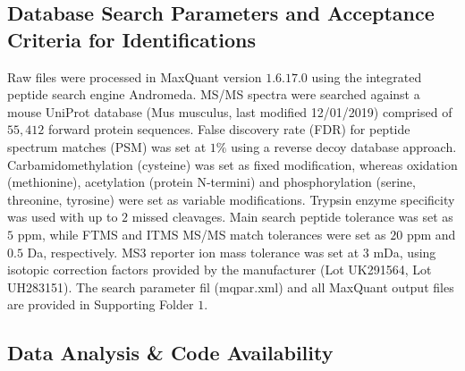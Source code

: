\documentclass[journal=jprobs,manuscript=article]{achemso}
\begin{document}
\subsection{Database Search Parameters and Acceptance Criteria for Identifications}

Raw files were processed in MaxQuant\cite{cox2008maxquant} version $1.6.17.0$ using the integrated peptide search engine Andromeda\cite{cox2011andromeda}. MS/MS spectra were searched against a mouse UniProt database (Mus musculus, last modified 12/01/2019) comprised of $55{,}412$ forward protein sequences. False discovery rate (FDR) for peptide spectrum matches (PSM) was set at $1\%$ using a reverse decoy database approach. Carbamidomethylation (cysteine) was set as fixed modification, whereas oxidation (methionine), acetylation (protein N-termini) and phosphorylation (serine, threonine, tyrosine) were set as variable modifications. Trypsin enzyme specificity was used with up to $2$ missed cleavages. Main search peptide tolerance was set as $5$ ppm, while FTMS and ITMS MS/MS match tolerances were set as $20$ ppm and $0.5$ Da, respectively. MS3 reporter ion mass tolerance was set at $3$ mDa, using isotopic correction factors provided by the manufacturer (Lot UK291564, Lot UH283151). The search parameter fil (mqpar.xml) and all MaxQuant output files are provided in Supporting Folder $1$.

\subsection{Data Analysis \& Code Availability}
\end{document}
